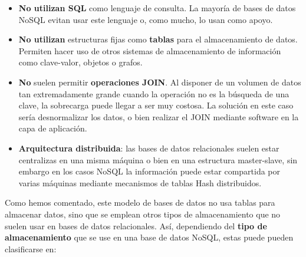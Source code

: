 \begin{itemize}
    \item \textbf{No utilizan SQL} como lenguaje de consulta. La mayoría de bases de datos NoSQL evitan usar este lenguaje o, como mucho, lo usan como apoyo.
    \item \textbf{No utilizan} estructuras fijas como \textbf{tablas} para el almacenamiento de datos. Permiten hacer uso de otros sistemas de almacenamiento de información como clave-valor, objetos o grafos.
    \item \textbf{No} suelen permitir \textbf{operaciones JOIN}. Al disponer de un volumen de datos tan extremadamente grande cuando la operación no es la búsqueda de una clave, la sobrecarga puede llegar a ser muy costosa. La solución en este caso sería desnormalizar los datos, o bien realizar el JOIN mediante software en la capa de aplicación.
    \item \textbf{Arquitectura distribuida}: las bases de datos relacionales suelen estar centralizas en una misma máquina o bien en una estructura master-slave, sin embargo en los casos NoSQL la información puede estar compartida por varias máquinas mediante mecanismos de tablas Hash distribuidos.
\end{itemize}

Como hemos comentado, este modelo de bases de datos no usa tablas para almacenar datos, sino que se emplean otros tipos de almacenamiento que no suelen usar en bases de datos relacionales. Así, dependiendo del \textbf{tipo de almacenamiento} que se use en una base de datos NoSQL, estas puede pueden clasificarse en:


